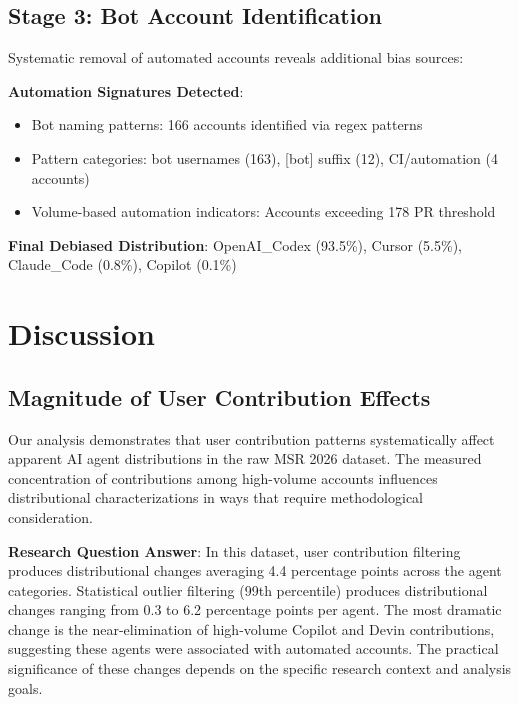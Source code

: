 \documentclass[conference]{IEEEtran}
\begin{document}
\subsection{Stage 3: Bot Account Identification}

Systematic removal of automated accounts reveals additional bias sources:

\textbf{Automation Signatures Detected}:
\begin{itemize}
    \item Bot naming patterns: 166 accounts identified via regex patterns
    \item Pattern categories: bot usernames (163), [bot] suffix (12), CI/automation (4 accounts)
    \item Volume-based automation indicators: Accounts exceeding 178 PR threshold
\end{itemize}

\textbf{Final Debiased Distribution}: OpenAI\_Codex (93.5\%), Cursor (5.5\%), Claude\_Code (0.8\%), Copilot (0.1\%)

\section{Discussion}

\subsection{Magnitude of User Contribution Effects}

Our analysis demonstrates that user contribution patterns systematically affect apparent AI agent distributions in the raw MSR 2026 dataset. The measured concentration of contributions among high-volume accounts influences distributional characterizations in ways that require methodological consideration.

\textbf{Research Question Answer}:
In this dataset, user contribution filtering produces distributional changes averaging 4.4 percentage points across the agent categories. Statistical outlier filtering (99th percentile) produces distributional changes ranging from 0.3 to 6.2 percentage points per agent. The most dramatic change is the near-elimination of high-volume Copilot and Devin contributions, suggesting these agents were associated with automated accounts. The practical significance of these changes depends on the specific research context and analysis goals.
\end{document}
